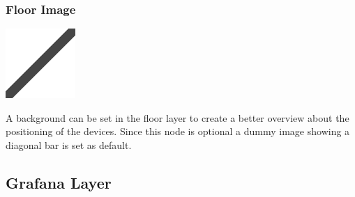 \subsubsection{Floor Image}
\noindent\begin{minipage}{0.15\textwidth}%
\includegraphics[width=\linewidth]{assets/images/dummy2}
\end{minipage}%
\hfill%
\begin{minipage}{0.8\textwidth}
A background can be set in the floor layer to create a better overview about the positioning of the devices. Since this node is optional a dummy image showing a diagonal bar is set as default.
\end{minipage}


\subsection{Grafana Layer}

